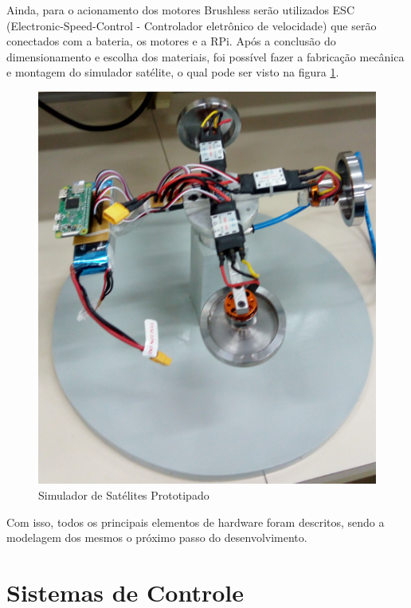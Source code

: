 Ainda, para o acionamento dos motores Brushless serão utilizados ESC (Electronic-Speed-Control - Controlador eletrônico de velocidade) que serão conectados com a bateria, os motores e a RPi. Após a conclusão do dimensionamento e escolha dos materiais, foi possível fazer a fabricação mecânica e montagem do simulador satélite, o qual pode ser visto na figura \ref{fig:simulador_real}.

\begin{figure}[H]
  \caption{Simulador de Satélites Prototipado}
  \begin{center}
      \includegraphics[scale=.5]{metodologia/img/simulador_real}
  \end{center}
  \label{fig:simulador_real}
\end{figure}

Com isso, todos os principais elementos de hardware foram descritos, sendo a modelagem dos mesmos o próximo passo do desenvolvimento.


\section{Sistemas de Controle}


